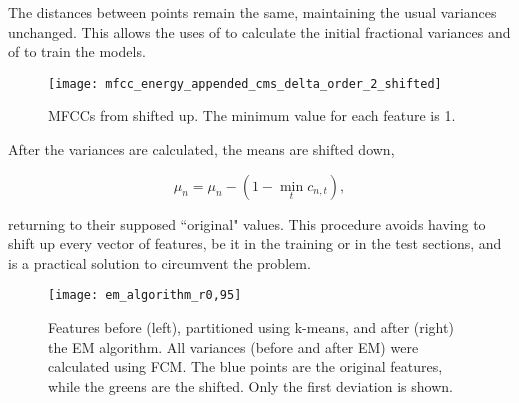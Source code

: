 \noindent The distances between points remain the same, maintaining the usual variances unchanged. This allows the uses of  to calculate the initial fractional variances and of  to train the models.

\begin{figure}[ht]
    \centering
    \texttt{[image: mfcc\_energy\_appended\_cms\_delta\_order\_2\_shifted]}
    \caption{MFCCs from  shifted up. The minimum value for each feature is 1.}
    \label{fig:mfcc-shifted}
\end{figure}

\noindent After the variances are calculated, the means are shifted down,

\begin{equation}
    \mu_n = \mu_n - (1 - \min_t c_{n,t}),
    \label{eq:means-shift-down}
\end{equation}

\noindent returning to their supposed ``original" values. This procedure avoids having to shift up every vector of features, be it in the training or in the test sections, and is a practical solution to circumvent the problem.

\begin{figure}[ht]
    \centering
    \texttt{[image: em\_algorithm\_r0,95]}
    \caption{Features before (left), partitioned using k-means, and after (right) the EM algorithm. All variances (before and after EM) were calculated using FCM. The blue points are the original features, while the greens are the shifted. Only the first deviation is shown.}
    \label{fig:frac-em_algorithm}
\end{figure}
